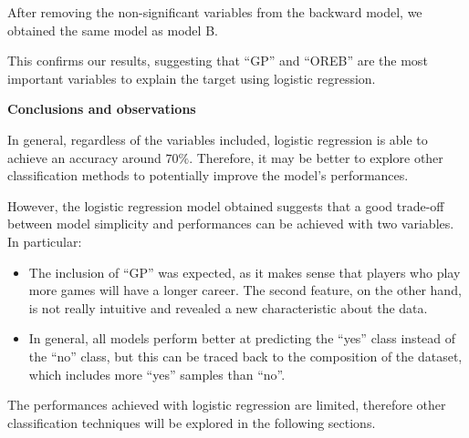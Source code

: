 After removing the non-significant variables from the backward model, we obtained the same model as model B. 

This confirms our results, suggesting that ``GP'' and ``OREB'' are the most important variables to explain the target using logistic regression. 

\vspace{0.2cm}
\textbf{Conclusions and observations}

In general, regardless of the variables included, logistic regression is able to achieve an accuracy around $70\%$. Therefore, it may be better to explore other classification methods to potentially improve the model's performances.

However, the logistic regression model obtained suggests that a good trade-off between model simplicity and performances can be achieved with two variables. In particular:

\begin{itemize}
	\item The inclusion of ``GP'' was expected, as it makes sense that players who play more games will have a longer career. The second feature, on the other hand, is not really intuitive and revealed a new characteristic about the data.
	\item In general, all models perform better at predicting the ``yes'' class instead of the ``no'' class, but this can be traced back to the composition of the dataset, which includes more ``yes'' samples than ``no''.
\end{itemize}

The performances achieved with logistic regression are limited, therefore other classification techniques will be explored in the following sections.
